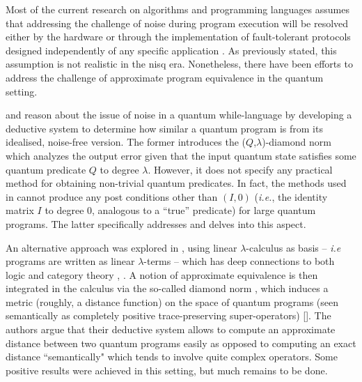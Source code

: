 Most of the current research on algorithms and programming languages assumes that addressing the challenge of noise during program execution will be resolved either by the hardware or through the implementation of fault-tolerant protocols designed independently of any specific application \cite{chong2017programming}. As previously stated, this assumption is not realistic in the \acrshort{nisq} era. Nonetheless, there have been efforts to address the challenge of approximate program equivalence in the quantum setting. 

\cite{hung2019quantitative} and \cite{tao2021gleipnir} reason about the issue of noise in a quantum while-language by developing a deductive system to determine how similar a quantum program is from its idealised, noise-free version. The former introduces the ($Q$,$\lambda$)-diamond norm which analyzes the output error given that the input quantum state satisfies some quantum predicate $Q$ to degree $\lambda$. However, it does not specify any practical method for obtaining non-trivial quantum predicates. In fact, the methods used in \cite{hung2019quantitative} cannot produce any post conditions other than $(I,0)$ (\textit{i.e.}, the identity matrix $I$ to degree 0, analogous to a ``true” predicate) for large quantum programs. The latter specifically addresses and delves into this aspect.  

An alternative approach was explored in \cite{dahlqvist2022syntactic}, using linear $\lambda$-calculus as basis – \textit{i.e} programs are written as linear $\lambda$-terms – which has deep connections to both logic and category theory \cite{girard1995advances}, \cite{benton1994mixed}. A notion of approximate equivalence is then
integrated in the calculus via the so-called diamond norm , which induces a metric (roughly, a distance function) on the space of quantum programs (seen semantically as completely positive trace-preserving super-operators) [\cite{watrous2018theory}]. The authors argue that their deductive system allows to compute an approximate distance between two quantum programs easily as opposed to computing an exact distance ``semantically" which tends to involve quite complex operators.  Some positive results were achieved in this setting, but much remains to be done.



